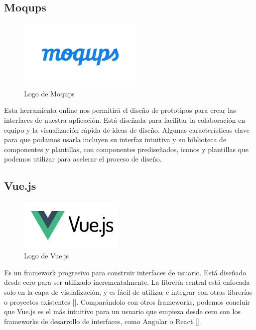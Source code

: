 \subsection{Moqups}

\begin{figure}[H]
    \centering
    \includegraphics[width=6cm]{archivos/tfg_jorge/logos/moqups}
    \caption{Logo de Moqups}\label{sistemass2}
\end{figure}

Esta herramienta online nos permitirá el diseño de prototipos para crear las interfaces de nuestra aplicación. Está diseñada para facilitar la colaboración en equipo y la visualización rápida de ideas de diseño. Algunas características clave para que podamos usarla incluyen su interfaz intuitiva y su biblioteca de componentes y plantillas, con componentes prediseñados, iconos y plantillas que podemos utilizar para acelerar el proceso de diseño.

\subsection{Vue.js}

\begin{figure}[H]
    \centering
    \includegraphics[width=5cm]{archivos/tfg_jorge/logos/vuejs}
    \caption{Logo de Vue.js}\label{sistemass2}
\end{figure}

Es un framework progresivo para construir interfaces de usuario. Está diseñado desde cero para ser utilizado incrementalmente. La librería central está enfocada solo en la capa de visualización, y es fácil de utilizar e integrar con otras librerías o proyectos existentes [\cite{def_vue}].
Comparándolo con otros frameworks, podemos concluir que Vue.js es el más intuitivo para un usuario que empieza desde cero con los frameworks de desarrollo de interfaces, como Angular o React [\cite{comparar_vue}].


